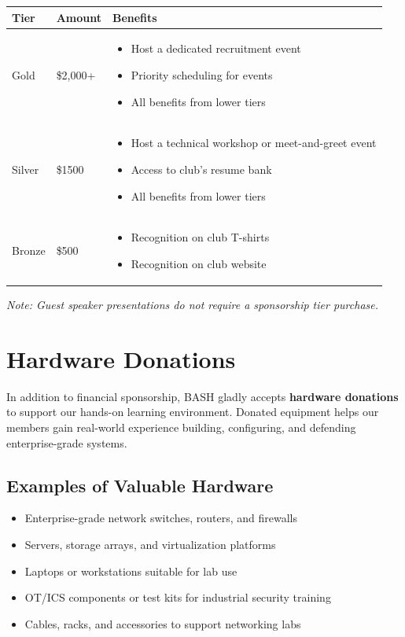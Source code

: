 \documentclass[11pt,letterpaper]{article}
\begin{document}
\begin{table}[h]
    \centering
    \begin{tabular}{p{2cm}p{3cm}p{8cm}}
        \toprule
        \textbf{Tier} & \textbf{Amount} & \textbf{Benefits} \\
        \midrule
        Gold & \$2,000+ & 
        \begin{itemize}[leftmargin=*,nosep]
            \item Host a dedicated recruitment event
            \item Priority scheduling for events
            \item All benefits from lower tiers
        \end{itemize} \\
        Silver & \$1500 & 
        \begin{itemize}[leftmargin=*,nosep]
            \item Host a technical workshop or meet-and-greet event
            \item Access to club's resume bank
            \item All benefits from lower tiers
        \end{itemize} \\
        Bronze & \$500 & 
        \begin{itemize}[leftmargin=*,nosep]
            \item Recognition on club T-shirts
            \item Recognition on club website
        \end{itemize} \\
        \bottomrule
    \end{tabular}
\end{table}
\vspace{2cm}
\textit{Note: Guest speaker presentations do not require a sponsorship tier purchase.}

\section*{Hardware Donations}
In addition to financial sponsorship, BASH gladly accepts \textbf{hardware donations} to support our hands-on learning environment. Donated equipment helps our members gain real-world experience building, configuring, and defending enterprise-grade systems.

\subsection*{Examples of Valuable Hardware}
\begin{itemize}
    \item Enterprise-grade network switches, routers, and firewalls
    \item Servers, storage arrays, and virtualization platforms
    \item Laptops or workstations suitable for lab use
    \item OT/ICS components or test kits for industrial security training
    \item Cables, racks, and accessories to support networking labs
\end{itemize}
\end{document}
